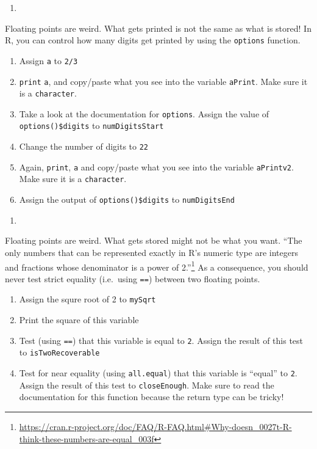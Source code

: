 \documentclass[12pt,krantz2]{krantz}
\providecommand{\tightlist}{%
  \setlength{\itemsep}{0pt}\setlength{\parskip}{0pt}}
\renewcommand{\href}[2]{#2\footnote{\url{#1}}}
\begin{document}
\begin{enumerate}
\def\labelenumi{\arabic{enumi}.}
\setcounter{enumi}{1}
\item
\end{enumerate}

Floating points are weird. What gets printed is not the same as what is stored! In R, you can control how many digits get printed by using the \texttt{options} function.

\begin{enumerate}
\def\labelenumi{\alph{enumi})}
\tightlist
\item
  Assign \texttt{a} to \texttt{2/3}
\item
  \texttt{print} \texttt{a}, and copy/paste what you see into the variable \texttt{aPrint}. Make sure it is a \texttt{character}.
\item
  Take a look at the documentation for \texttt{options}. Assign the value of \texttt{options()\$digits} to \texttt{numDigitsStart}
\item
  Change the number of digits to \texttt{22}
\item
  Again, \texttt{print}, \texttt{a} and copy/paste what you see into the variable \texttt{aPrintv2}. Make sure it is a \texttt{character}.
\item
  Assign the output of \texttt{options()\$digits} to \texttt{numDigitsEnd}
\end{enumerate}

\begin{enumerate}
\def\labelenumi{\arabic{enumi}.}
\setcounter{enumi}{2}
\item
\end{enumerate}

Floating points are weird. What gets stored might not be what you want. \href{https://cran.r-project.org/doc/FAQ/R-FAQ.html\#Why-doesn_0027t-R-think-these-numbers-are-equal_003f}{``The only numbers that can be represented exactly in R's numeric type are integers and fractions whose denominator is a power of 2.''} As a consequence, you should never test strict equality (i.e.~using \texttt{==}) between two floating points.

\begin{enumerate}
\def\labelenumi{\alph{enumi})}
\tightlist
\item
  Assign the squre root of 2 to \texttt{mySqrt}
\item
  Print the square of this variable
\item
  Test (using \texttt{==}) that this variable is equal to \texttt{2}. Assign the result of this test to \texttt{isTwoRecoverable}
\item
  Test for near equality (using \texttt{all.equal}) that this variable is ``equal'' to \texttt{2}. Assign the result of this test to \texttt{closeEnough}. Make sure to read the documentation for this function because the return type can be tricky!
\end{enumerate}
\end{document}

